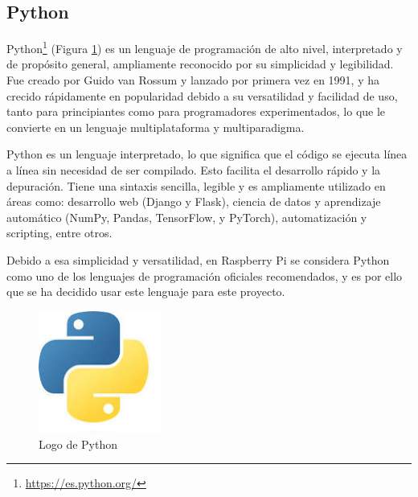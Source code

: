 
\subsection{Python}

Python\footnote{\url{https://es.python.org/}} (Figura \ref{fig:python}) es un lenguaje de programación de alto nivel, interpretado y de propósito general, ampliamente reconocido por su simplicidad y legibilidad. Fue creado por Guido van Rossum y lanzado por primera vez en 1991, y ha crecido rápidamente en popularidad debido a su versatilidad y facilidad de uso, tanto para principiantes como para programadores experimentados, lo que le convierte en un lenguaje multiplataforma y multiparadigma.

Python es un lenguaje interpretado, lo que significa que el código se ejecuta línea a línea sin necesidad de ser compilado. Esto facilita el desarrollo rápido y la depuración. Tiene una sintaxis sencilla, legible y es ampliamente utilizado en áreas como: desarrollo web (Django y Flask), ciencia de datos y aprendizaje automático (NumPy, Pandas, TensorFlow, y PyTorch), automatización y scripting, entre otros.

Debido a esa simplicidad y versatilidad, en Raspberry Pi se considera Python como uno de los lenguajes de programación oficiales recomendados, y es por ello que se ha decidido usar este lenguaje para este proyecto.

\begin{figure} [h!]
	\begin{center}
		\includegraphics[width=4cm]{figs/python.png}
	\end{center}
	\caption{Logo de Python}  %
	\label{fig:python}
\end{figure}



